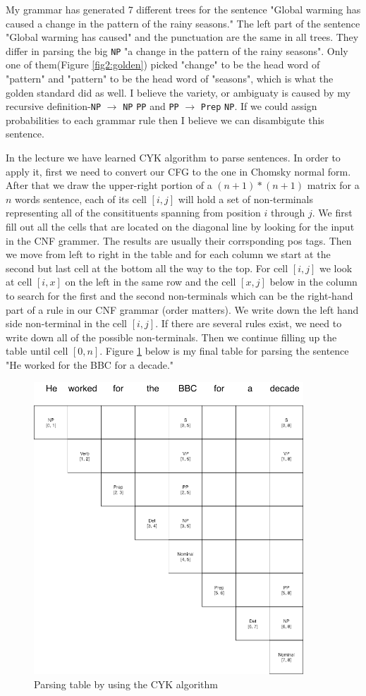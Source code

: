 \documentclass[11pt]{article} %
\begin{document}
My grammar has generated 7 different trees for the sentence "Global warming has caused a change in the pattern of the rainy seasons." The left part of the sentence "Global warming has caused" and the punctuation are the same in all trees. They differ in parsing the big \texttt{NP} "a change in the pattern of the rainy seasons". Only one of them(Figure \ref{fig2:golden}) picked "change" to be the head word of "pattern" and "pattern" to be the head word of "seasons", which is what the golden standard did as well. I believe the variety, or ambiguaty is caused by my recursive definition-\texttt{NP} $\rightarrow$ \texttt{NP} \texttt{PP} and \texttt{PP} $\rightarrow$ \texttt{Prep} \texttt{NP}. If we could assign probabilities to each grammar rule then I believe we can disambigute this sentence.

In the lecture we have learned CYK algorithm to parse sentences. In order to apply it, first we need to convert our CFG to the one in Chomsky normal form\cite[436]{JurafskyMartin200805}. After that we draw the upper-right portion of a $(n+1)*(n+1)$ matrix for a $n$ words sentence, each of its cell $[i, j]$ will hold a set of non-terminals representing all of the consitituents spanning from position $i$ through $j$. We first fill out all the cells that are located on the diagonal line by looking for the input in the CNF grammer. The results are usually their corrsponding pos tags. Then we move from left to right in the table and for each column we start at the second but last cell at the bottom all the way to the top. For cell $[i, j]$ we look at cell $[i, x]$ on the left in the same row and the cell $[x, j]$ below in the column to search for the first and the second non-terminals which can be the right-hand part of a rule in our CNF grammar (order matters). We write down the left hand side non-terminal in the cell $[i, j]$. If there are several rules exist, we need to write down all of the possible non-terminals. Then we continue filling up the table until cell $[0, n]$. Figure \ref{fig3:cyk} below is my final table for parsing the sentence "He worked for the BBC for a decade."

\begin{figure}[ht]
  \centering
  \includegraphics[width=0.9\textwidth]{images/figure_cyk.png}
  \caption{Parsing table by using the CYK algorithm}
  \label{fig3:cyk}
\end{figure}

\printbibliography
\end{document}
